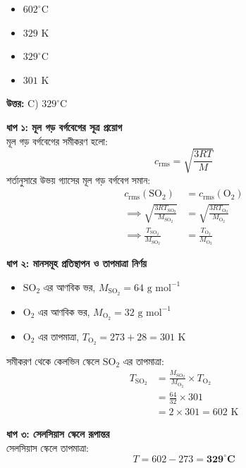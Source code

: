 \documentclass[12pt, a4paper]{article}
\begin{document}
\begin{itemize}[label={}, leftmargin=1cm, itemsep=0.5em]
    \item[\textbf{A)}] $602^\circ\text{C}$
    \item[\textbf{B)}] $329\text{ K}$
    \item[\textbf{C)}] $329^\circ\text{C}$
    \item[\textbf{D)}] $301\text{ K}$
\end{itemize}

\vspace{0.5em}
\begin{tcolorbox}[answerbox]
    \textbf{\color{success} উত্তর:} C) $329^\circ\text{C}$
\end{tcolorbox}
\vspace{1em}

\begin{tcolorbox}[solutionbox={সমাধান (Solution)}]
    \noindent
    \textbf{ধাপ ১: মূল গড় বর্গবেগের সূত্র প্রয়োগ} \\
    মূল গড় বর্গবেগের সমীকরণ হলো:
    \[ c_{\text{rms}} = \sqrt{\frac{3RT}{M}} \]
    শর্তানুসারে উভয় গ্যাসের মূল গড় বর্গবেগ সমান:
    \begin{align*}
        c_{\text{rms}}(\text{SO}_2) &= c_{\text{rms}}(\text{O}_2) \\
        \implies \sqrt{\frac{3 R T_{\text{SO}_2}}{M_{\text{SO}_2}}} &= \sqrt{\frac{3 R T_{\text{O}_2}}{M_{\text{O}_2}}} \\
        \implies \frac{T_{\text{SO}_2}}{M_{\text{SO}_2}} &= \frac{T_{\text{O}_2}}{M_{\text{O}_2}}
    \end{align*}
    
    \vspace{0.4em}
    \noindent\textbf{ধাপ ২: মানসমূহ প্রতিস্থাপন ও তাপমাত্রা নির্ণয়}
    \begin{itemize}[leftmargin=1.5em, itemsep=0.2em]
        \item $\text{SO}_2$ এর আণবিক ভর, $M_{\text{SO}_2} = 64\text{ g mol}^{-1}$
        \item $\text{O}_2$ এর আণবিক ভর, $M_{\text{O}_2} = 32\text{ g mol}^{-1}$
        \item $\text{O}_2$ এর তাপমাত্রা, $T_{\text{O}_2} = 273 + 28 = 301\text{ K}$
    \end{itemize}
    সমীকরণ থেকে কেলভিন স্কেলে $\text{SO}_2$ এর তাপমাত্রা:
    \begin{align*}
        T_{\text{SO}_2} &= \frac{M_{\text{SO}_2}}{M_{\text{O}_2}} \times T_{\text{O}_2} \\
        &= \frac{64}{32} \times 301 \\
        &= 2 \times 301 = 602\text{ K}
    \end{align*}
    
    \vspace{0.4em}
    \noindent\textbf{ধাপ ৩: সেলসিয়াস স্কেলে রূপান্তর} \\
    সেলসিয়াস স্কেলে তাপমাত্রা:
    \[ T = 602 - 273 = \mathbf{329^\circ\text{C}} \]
\end{tcolorbox}
\end{document}
